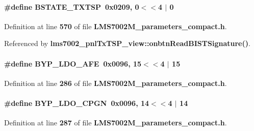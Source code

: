 \paragraph[{B\+S\+T\+A\+T\+E\+\_\+\+T\+X\+T\+SP}]{\setlength{\rightskip}{0pt plus 5cm}\#define B\+S\+T\+A\+T\+E\+\_\+\+T\+X\+T\+SP~0x0209, 0$<$$<$4 $\vert$  0}\label{LMS7002M__parameters__compact_8h_a26dcba6f6358bdb480517f61fc0eea95}


Definition at line {\bf 570} of file {\bf L\+M\+S7002\+M\+\_\+parameters\+\_\+compact.\+h}.



Referenced by {\bf lms7002\+\_\+pnl\+Tx\+T\+S\+P\+\_\+view\+::onbtn\+Read\+B\+I\+S\+T\+Signature()}.

\paragraph[{B\+Y\+P\+\_\+\+L\+D\+O\+\_\+\+A\+FE}]{\setlength{\rightskip}{0pt plus 5cm}\#define B\+Y\+P\+\_\+\+L\+D\+O\+\_\+\+A\+FE~0x0096, 15$<$$<$4 $\vert$  15}\label{LMS7002M__parameters__compact_8h_a7870c63b7d5f045fd15f3ddbfe09ed0a}


Definition at line {\bf 286} of file {\bf L\+M\+S7002\+M\+\_\+parameters\+\_\+compact.\+h}.

\paragraph[{B\+Y\+P\+\_\+\+L\+D\+O\+\_\+\+C\+P\+GN}]{\setlength{\rightskip}{0pt plus 5cm}\#define B\+Y\+P\+\_\+\+L\+D\+O\+\_\+\+C\+P\+GN~0x0096, 14$<$$<$4 $\vert$  14}\label{LMS7002M__parameters__compact_8h_a6134825c68d7ace3cc2c56bbad1f509d}


Definition at line {\bf 287} of file {\bf L\+M\+S7002\+M\+\_\+parameters\+\_\+compact.\+h}.

